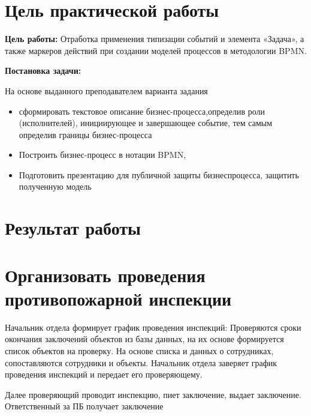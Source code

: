 
\section*{\LARGE Цель практической работы}

\textbf{Цель работы:} Отработка применения типизации событий и элемента
«Задача», а также маркеров действий при создании моделей процессов в
методологии BPMN.



\textbf{Постановка задачи:}\par
На основе выданного преподавателем варианта задания
\begin{itemize}
    \item сформировать текстовое описание бизнес-процесса,определив роли (исполнителей), инициирующее и завершающее событие, тем самым определив границы бизнес-процесса
    \item Построить бизнес-процесс в нотации BPMN,
    \item Подготовить презентацию для публичной защиты бизнеспроцесса, защитить полученную модель
\end{itemize}


\newpage

\section*{\LARGE Результат работы}

\section{Организовать проведения противопожарной инспекции}
Начальник отдела формирует график проведения инспекций:
Проверяются сроки окончания заключений объектов из базы данных, на их основе формируется список объектов на проверку.
На основе списка и данных о сотрудниках, сопоставляются сотрудники и объекты.
Начальник отдела заверяет график проведения инспекций и передает его проверяющему.

Далее проверяющий проводит инспекцию, пиет заключение, выдает заключение.
Ответственный за ПБ получает заключение


\clearpage

\newpage


